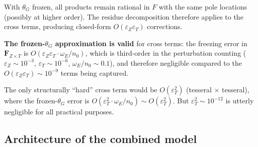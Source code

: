 \documentclass[11pt]{article}
\newcommand{\eps}{\varepsilon}
\begin{document}
With $\theta_G$ frozen, all products remain rational in $F$ with the same
pole locations (possibly at higher order). The residue decomposition
therefore applies to the cross terms, producing closed-form
$O(\eps_Z \eps_T)$ corrections.

\textbf{The frozen-$\theta_G$ approximation is valid} for cross terms:
the freezing error in $\bm F_{Z \times T}$ is
$O(\eps_Z \eps_T \cdot \omega_E/n_0)$, which is third-order in the
perturbation counting ($\eps_Z \sim 10^{-3}$,
$\eps_T \sim 10^{-6}$, $\omega_E/n_0 \sim 0.1$), and therefore negligible
compared to the $O(\eps_Z \eps_T) \sim 10^{-9}$ terms being captured.

The only structurally ``hard'' cross term would be $O(\eps_T^2)$
(tesseral $\times$ tesseral), where the frozen-$\theta_G$ error is
$O(\eps_T^2 \cdot \omega_E/n_0) \sim O(\eps_T^2)$. But
$\eps_T^2 \sim 10^{-12}$ is utterly negligible for all practical purposes.

\subsection{Architecture of the combined model}
\end{document}

